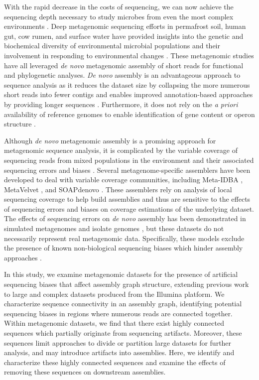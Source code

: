 \documentclass[10pt]{article}
\begin{document}
With the rapid decrease in the costs of sequencing, we can now achieve
the sequencing depth necessary to study microbes from even the most
complex environments \cite{Hess:2011p686,Qin:2010p189}.  Deep
metagenomic sequencing efforts in permafrost soil, human gut, cow
rumen, and surface water have provided insights into the genetic and
biochemical diversity of environmental microbial populations
\cite{Hess:2011p686,Iverson:2012p1281,Qin:2010p189} and their involvement in responding to environmental changes
\cite{Mackelprang:2011p1087}. These metagenomic studies have all
leveraged \emph{de novo} metagenomic assembly of short reads for
functional and phylogenetic analyses. \emph{De novo} assembly is an
advantageous approach to sequence analysis as it reduces the dataset
size by collapsing the more numerous short reads into fewer contigs
and enables improved annotation-based approaches by providing longer
sequences \cite{Miller:2010p226,Pop:2009p798}. Furthermore, it does
not rely on the {\em a priori} availability of reference genomes to enable
identification of gene content or operon structure
\cite{Hess:2011p686,Iverson:2012p1281}.

Although \emph{de novo} metagenomic assembly is a promising approach
for metagenomic sequence analysis, it is complicated by the variable
coverage of sequencing reads from mixed populations in the environment
and their associated sequencing errors and biases
\cite{Mende:2012p1262,Pignatelli:2011p742}. Several
metagenome-specific assemblers have been developed to deal with
variable coverage communities, including Meta-IDBA
\cite{Peng:2011p898}, MetaVelvet \cite{Namiki:2012iq}, and SOAPdenovo \cite{Li:2010p234}.  These
assemblers rely on analysis of local sequencing coverage to help build
assemblies and thus are sensitive to the effects of sequencing errors
and biases on coverage estimations of the underlying dataset. The
effects of sequencing errors on \emph{de novo} assembly has been
demonstrated in simulated metagenomes
\cite{Mavromatis:2006p894,Mende:2012p1262,Pignatelli:2011p742} and
isolate genomes \cite{Morgan:2010p740,Chitsaz:2011kr}, but these datasets do not necessarily represent real metagenomic
data. Specifically, these models exclude the presence of known
non-biological sequencing biases which hinder assembly approaches
\cite{GomezAlvarez:2009p1334,Keegan:2012p1336,Niu:2010p1333}.

In this study, we examine metagenomic datasets for the presence of
artificial sequencing biases that affect assembly graph structure,
extending previous work to large and complex datasets produced from
the Illumina platform. We characterize sequence connectivity in an
assembly graph, identifying potential sequencing biases in regions
where numerous reads are connected together.  Within metagenomic
datasets, we find that there exist highly connected sequences which
partially originate from sequencing artifacts.  Moreover, these
sequences limit approaches to divide or partition large datasets for
further analysis, and may introduce artifacts into assemblies.  Here,
we identify and characterize these highly connected sequences and
examine the effects of removing these sequences on downstream
assemblies.
\end{document}
